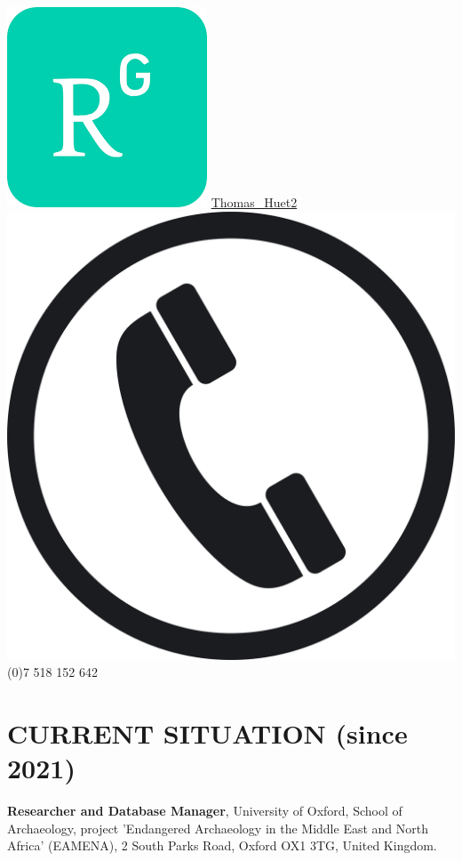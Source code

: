 \documentclass{article}
\newcommand{\fr}[1]{} %
\newcommand{\en}[1]{#1}   %
\begin{document}
\includegraphics[scale=0.050]{rgate} \quad \href{https://www.researchgate.net/profile/Thomas\_Huet2}{Thomas\_Huet2} \\
\includegraphics[scale=0.005]{phone} \quad  {} (0)7 518 152 642 \\


\section{\fr{SITUATION ACTUELLE (depuis 2021)}\en{CURRENT SITUATION (since 2021)}}
\textbf{Researcher and Database Manager}, University of Oxford, School of Archaeology, project 'Endangered Archaeology in the Middle East and North Africa' (EAMENA), 2 South Parks Road, Oxford OX1 3TG, United Kingdom.
\end{document}
